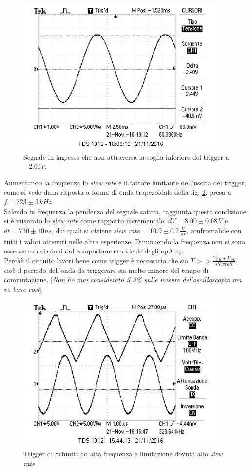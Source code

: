\documentclass[10pt,a4paper]{article}
\newcommand{\rem}[1]{[\emph{#1}]}
\begin{document}
\begin{figure}[htb!]
\centering
\includegraphics[scale=1.0]{immagini/sottoSogliaInferiore.png}
\caption{Segnale in ingresso che non attraversa la soglia inferiore del trigger a $-2.60V$.}
\label{sottoSoglia}
\end{figure}

Aumentando la frequenza  lo \emph{slew rate} è il fattore limitante dell'uscita del trigger, come si vede dalla risposta a forma di onda trapezoidale della fig. \ref{slew}, presa a $f = 323 \pm 3 \, kHz$. \\
Salendo in frequenza la pendenza del segnale satura, raggiunta questa condizione si è misurato lo \emph{slew rate} come rapporto incrementale: $dV = 8.00 \pm 0.08 \, V$ e $dt = 730 \pm 10 ns$, dai quali si ottiene \emph{slew rate} = $10.9 \pm 0.2 \, \frac{V}{\mu s}$, confrontabile con tutti i valori ottenuti nelle altre esperienze. Diminuendo la frequenza non si sono osservate deviazioni dal comportamento ideale degli opAmp. \\
Perchè il circuito lavori bene come trigger è necessario che sia $T >> \frac{V_{OH}+V_{OL}}{slew rate}$, cioè il periodo dell'onda da triggerare sia molto minore del tempo di commutazione.
\rem{Non ho mai considerato il 3\% sulle misure del'oscilloscopio ma va bene così}

\begin{figure}[htb!]
\centering
\includegraphics[scale=1.0]{immagini/slewRate.png}
\caption{Trigger di Schmitt ad alta frequenza e limitazione dovuta allo \emph{slew rate}}
\label{slew}
\end{figure}
\end{document}
